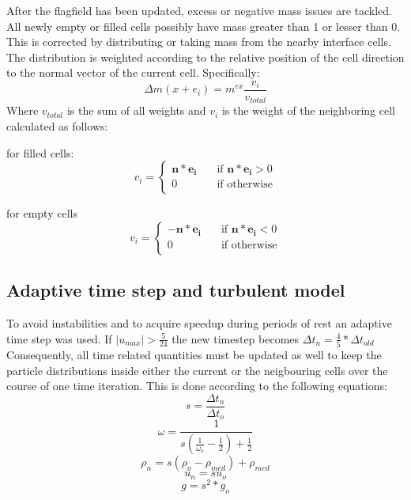 \documentclass[10pt,a4paper,notitlepage]{article}
\begin{document}
After the flagfield has been updated, excess or negative mass issues are tackled. All newly empty or filled cells possibly have mass greater than 1 or lesser than 0. This is corrected by distributing or taking mass from the nearby interface cells. The distribution is weighted according to the relative position of the cell direction to the normal vector of the current cell. Specifically:
\begin{equation} \label{eq:exmass}
\Delta m(x+e_{i})=m^{ex}\frac{v_{i}}{v_{total}}
\end{equation}
Where $v_{total}$ is the sum of all weights and $v_{i}$ is the weight of the neighboring cell calculated as follows:

for filled cells:
\begin{equation} \label{eq:filledweight}
  v_i = 
  \begin{cases}
    \mathbf{n*e_{i}}     & \quad \text{if }  \text{$\mathbf{n*e_{i}}>0$}\\
    0			 & \quad \text{if }  \text{otherwise}\\
  \end{cases}
\end{equation}

for empty cells
\begin{equation} \label{eq:emptyweight}
  v_i = 
  \begin{cases}
    -\mathbf{n*e_{i}}     & \quad \text{if }  \text{$\mathbf{n*e_{i}}<0$}\\
    0			  & \quad \text{if }  \text{otherwise}\\
  \end{cases}
\end{equation}

\subsection{Adaptive time step and turbulent model}

To avoid instabilities and to acquire speedup during periods of rest an adaptive time step was used. If $|u_{max}|>\frac{5}{24}$ the new timestep becomes $\Delta t_{n}=\frac{4}{5}*\Delta t_{old}$
Consequently, all time related quantities must be updated as well to keep the particle distributions inside either the current or the neigbouring cells over the course of one time iteration. This is done according to the following equations:
\begin{equation} \label{eq:dt}
s=\frac{\Delta t_{n}}{\Delta t_{o}}
\end{equation}
\begin{equation} \label{eq:omega}
\omega=\frac{1}{s(\frac{1}{\omega_{o}}-\frac{1}{2})+\frac{1}{2}}
\end{equation}
\begin{equation} \label{eq:density}
\rho_{n}=s(\rho_{o}-\rho_{med})+\rho_{med}
\end{equation}
\begin{equation} \label{eq:velocity}
u_{n}=su_{o}
\end{equation}
\begin{equation} \label{eq:gravity}
g=s^{2}*g_{o}
\end{equation}
\end{document}
